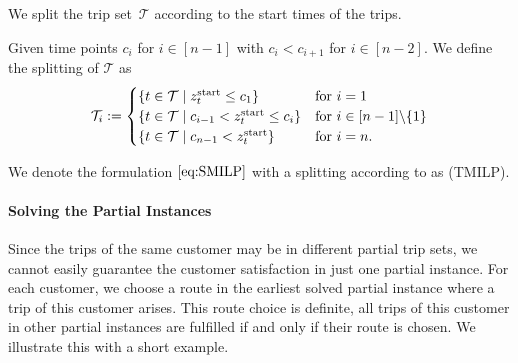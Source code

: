 We split the trip set~$\mathcal{T}$ according to the start times of the trips.

\begin{definition}
\label{def:time_dependent_splitting}

Given time points $c_i$ for $i\in[n-1]$ with $c_i<c_{i+1}$ for $i\in[n-2]$. We define the splitting of $\mathcal{T}$ as
\begin{align*}
	\mathcal{T}_i := \begin{cases}
		\left\{t\in\mathcal{T}\mid z^{\operatorname{start}}_t\leq c_1\right\} & \text{for } i=1 \\
		\left\{t\in\mathcal{T}\mid c_{i-1}<z^{\operatorname{start}}_t\leq c_i\right\} & \text{for } i\in[n-1]\backslash\{1\} \\
		\left\{t\in\mathcal{T}\mid c_{n-1}<z^{\operatorname{start}}_t\right\} & \text{for } i=n.
	\end{cases}
\end{align*}

\end{definition}

We denote the formulation $\eqref{eq:SMILP}$ with a splitting according to  as (TMILP).

\paragraph{Solving the Partial Instances} \parfill

Since the trips of the same customer may be in different partial trip sets, we cannot easily guarantee the customer satisfaction in just one partial instance. For each customer, we choose a route in the earliest solved partial instance where a trip of this customer arises. This route choice is definite, \ie all trips of this customer in other partial instances are fulfilled if and only if their route is chosen. We illustrate this with a short example.

